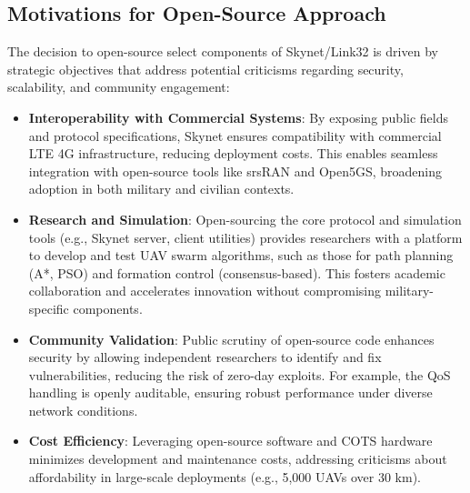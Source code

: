 \documentclass{article}
\begin{document}
\subsection{Motivations for Open-Source Approach}
The decision to open-source select components of Skynet/Link32 is driven
by strategic objectives that address potential criticisms regarding security,
scalability, and community engagement:
\begin{itemize}
    \item \textbf{Interoperability with Commercial Systems}:
    By exposing public fields and protocol specifications,
    Skynet ensures compatibility with commercial LTE 4G infrastructure,
    reducing deployment costs. This enables seamless integration with
    open-source tools like srsRAN and Open5GS, broadening adoption in
    both military and civilian contexts.
    \item \textbf{Research and Simulation}: Open-sourcing the core protocol
    and simulation tools (e.g., Skynet server, client utilities) provides
    researchers with a platform to develop and test UAV swarm algorithms,
    such as those for path planning (A*, PSO) and formation control (consensus-based).
    This fosters academic collaboration and accelerates innovation without
    compromising military-specific components.
    \item \textbf{Community Validation}:
    Public scrutiny of open-source code enhances security by allowing
    independent researchers to identify and fix vulnerabilities,
    reducing the risk of zero-day exploits. For example, the QoS
    handling is openly auditable, ensuring robust performance under
    diverse network conditions.
    \item \textbf{Cost Efficiency}:
    Leveraging open-source software and COTS hardware minimizes development
    and maintenance costs, addressing criticisms about affordability in
    large-scale deployments (e.g., 5,000 UAVs over 30 km).
\end{itemize}
\end{document}
